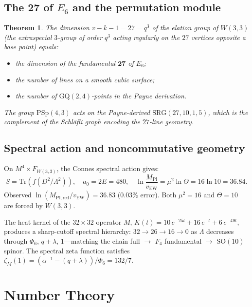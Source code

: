 \documentclass[12pt,a4paper]{article}
\newtheorem{theorem}{Theorem}[section]
\theoremstyle{definition}
\newcommand{\SRG}{\mathrm{SRG}}
\newcommand{\GQ}{\mathrm{GQ}}
\newcommand{\PSp}{\mathrm{PSp}}
\newcommand{\SO}{\mathrm{SO}}
\renewcommand{\Tr}{\mathrm{Tr}}
\newcommand{\Phisix}{\Phi_6}
\newcommand{\vEW}{v_{\mathrm{EW}}}
\begin{document}
\subsection{The 27 of \texorpdfstring{$E_6$}{E6} and the permutation module}

\begin{theorem}
The dimension $v-k-1=27=q^3$ of the \emph{elation group} of $W(3,3)$
(the extraspecial $3$-group of order $q^3$ acting regularly on the
$27$ vertices opposite a base point) equals:
\begin{itemize}[nosep]
\item the dimension of the fundamental $\mathbf{27}$ of $E_6$;
\item the number of lines on a smooth cubic surface;
\item the number of $\GQ(2,4)$-points in the Payne derivation.
\end{itemize}
The group $\PSp(4,3)$ acts on the Payne-derived $\SRG(27,10,1,5)$, which
is the complement of the Schl\"afli graph encoding the $27$-line geometry.
\end{theorem}

\subsection{Spectral action and noncommutative geometry}

On $M^4\times F_{W(3,3)}$, the Connes spectral action gives:
\begin{equation}
  S = \Tr(f(D^2/\Lambda^2)),\quad
  a_0 = 2E = 480,\quad
  \ln\frac{M_{\mathrm{Pl}}}{\vEW} = \mu^2\ln\Theta = 16\ln 10 = 36.84.
\end{equation}
Observed $\ln(M_{\mathrm{Pl,red}}/\vEW)=36.83$ ($0.03\%$ error).
Both $\mu^2=16$ and $\Theta=10$ are forced by $W(3,3)$.

The heat kernel of the $32{\times}32$ operator $M$,
$K(t) = 10\,e^{-25t} + 16\,e^{-t} + 6\,e^{-49t}$,
produces a sharp-cutoff spectral hierarchy:
$32\to 26\to 16\to 0$ as $\Lambda$ decreases through
$\Phisix$, $q{+}\lambda$, $1$---matching the chain
full $\to$ $F_4$ fundamental $\to$ $\SO(10)$ spinor.
The spectral zeta function satisfies
$\zeta_M(1) = (\alpha^{-1}{-}(q{+}\lambda))/\Phisix = 132/7$.


\section{Number Theory}
\label{sec:number_theory}
\end{document}
